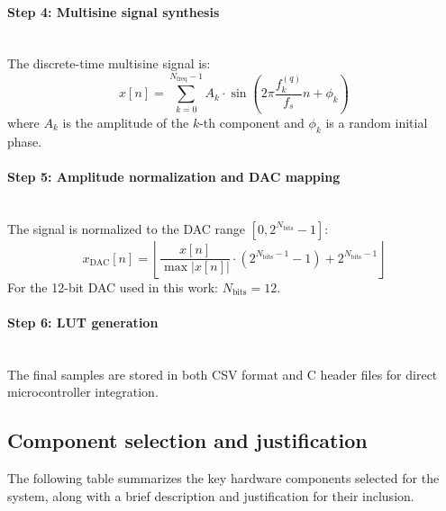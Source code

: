 \paragraph{Step 4: Multisine signal synthesis}\\
The discrete-time multisine signal is:
\begin{equation}
x[n] = \sum_{k=0}^{N_{\text{freq}}-1} A_k \cdot \sin\left( 2\pi \frac{f_k^{(q)}}{f_s} n + \phi_k \right)
\label{eq:multisine}
\end{equation}
where \( A_k \) is the amplitude of the \( k \)-th component and \( \phi_k \) is a random initial phase.

\paragraph{Step 5: Amplitude normalization and DAC mapping}\\
The signal is normalized to the DAC range \([0, 2^{N_{\text{bits}}} - 1]\):
\begin{equation}
x_{\text{DAC}}[n] = \left\lfloor \frac{x[n]}{\max |x[n]|} \cdot \left(2^{N_{\text{bits}}-1} - 1\right) + 2^{N_{\text{bits}}-1} \right\rfloor
\label{eq:dac_mapping}
\end{equation}
For the 12-bit DAC used in this work: \( N_{\text{bits}} = 12 \).


\paragraph{Step 6: LUT generation}\\
The final samples are stored in both CSV format and C header files for direct microcontroller integration.

\subsection{Component selection and justification}
The following table summarizes the key hardware components selected for the system, along with a brief description and justification for their inclusion.


